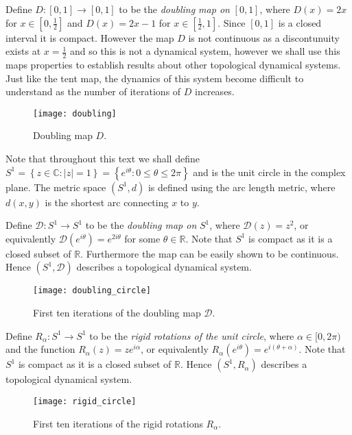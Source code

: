 \begin{exmp} \label{exmp:doubling-map}
    Define $D: [0,1] \to [0,1]$ to be the \emph{doubling map on} $[0, 1]$, where $D(x) = 2x$ for $x \in \left[0, \frac{1}{2}\right]$ and $D(x) = 2x - 1$ for $x \in \left[\frac{1}{2}, 1\right]$. Since $[0, 1]$ is a closed interval it is compact. However the map $D$ is not continuous as a discontunuity exists at $x = \frac{1}{2}$ and so this is not a dynamical system, however we shall use this maps properties to establish results about other topological dynamical systems. Just like the tent map, the dynamics of this system become difficult to understand as the number of iterations of $D$ increases.

    \begin{figure}[h]
        \centering
        \texttt{[image: doubling]}
        \caption{Doubling map $D$.}
        \label{fig:doubling}
    \end{figure}
\end{exmp}

Note that throughout this text we shall define $S^1 = \left\lbrace z \in \mathbb{C}: |z| = 1 \right\rbrace = \left\lbrace e^{i\theta} : 0 \leq \theta \leq 2\pi \right\rbrace$ and is the unit circle in the complex plane. The metric space $(S^1, d)$ is defined using the arc length metric, where $d(x, y)$ is the shortest arc connecting $x$ to $y$. 

\begin{exmp} \label{exmp:doubling-map-s1}
    Define $\mathcal{D}: S^1 \to S^1$ to be the \emph{doubling map on} $S^1$, where $\mathcal{D}(z) = z^2$, or equivalently $\mathcal{D}(e^{i\theta}) = e^{2i\theta}$ for some $\theta \in \mathbb{R}$. Note that $S^1$ is compact as it is a closed subset of $\mathbb{R}$. Furthermore the map can be easily shown to be continuous. Hence $(S^1, \mathcal{D})$ describes a topological dynamical system.

    \begin{figure}[h]
        \centering
        \texttt{[image: doubling\_circle]}
        \caption{First ten iterations of the doubling map $\mathcal{D}$.}
        \label{fig:doubling-circle}
    \end{figure}
\end{exmp}

\begin{exmp} \label{exmp:rigid-rotations}
    Define $R_\alpha: S^1 \to S^1$ to be the \emph{rigid rotations of the unit circle}, where $\alpha \in [0, 2\pi)$ and the function $R_{\alpha}(z) = ze^{i\alpha}$, or equivalently $R_\alpha(e^{i\theta}) = e^{i(\theta + \alpha)}$. Note that $S^1$ is compact as it is a closed subset of $\mathbb{R}$. Hence $(S^1, R_{\alpha})$ describes a topological dynamical system.

    \begin{figure}[h]
        \centering
        \texttt{[image: rigid\_circle]}
        \caption{First ten iterations of the rigid rotations $R_\alpha$.}
        \label{fig:rigid-circle}
    \end{figure}
\end{exmp}

